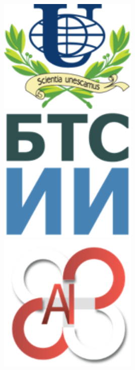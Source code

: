 \documentclass[default]{beamer}
\begin{document}
\begin{frame}
\begin{columns}
\begin{column}{0.15\textwidth}
				\vspace{7pt}
				\includegraphics[width=0.5\textwidth]{advert/rupf.png}
				\vspace{7pt}
				\includegraphics[width=0.5\textwidth]{advert/aiuv.png}
				\vspace{7pt}
				\includegraphics[width=0.5\textwidth]{advert/aeronet.png}
			\end{column}
		\end{columns}
	\end{frame}
	
\end{document}

